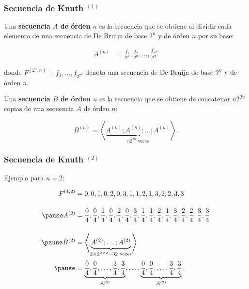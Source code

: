\documentclass[t, 10pt, mathserif]{beamer}
\begin{document}

\begin{frame}
  \frametitle{Secuencia de Knuth {$^{(1)}$}}

  \vspace{-0.4cm}
  \begin{definition}
    Una \textbf{secuencia $A$ de órden $n$} es la secuencia que se obtiene al dividir cada elemento de una secuencia de De Bruijn de base $2^n$ y de órden $n$ por su base:
    \pause

    \vspace{-0.2cm}
    \begin{equation*}
      \begin{aligned}
        A^{(n)} & = \frac{f_1}{2^n}, \frac{f_2}{2^n}, \dots, \frac{f_{2^{n^2}}}{2^n}
      \end{aligned}
    \end{equation*}

    \vspace{-0.2cm}
    donde $F^{(2^n, n)} = f_1, \dots, f_{2^{n^2}}$ denota una secuencia de De Bruijn de base $2^n$ y de órden $n$.
    \pause

    Una \textbf{secuencia $B$ de órden $n$} es la secuencia que se obtiene de concatenar $n 2^{2 n}$ copias de una secuencia $A$ de órden $n$:
    \pause

    \vspace{-0.2cm}
    \begin{equation*}
      B^{(n)} = \left< \underbrace{A^{(n)} ; A^{(n)} ; \dots ; A^{(n)}}_{n 2^{2 n} \text{ veces}} \right> \text{.}
    \end{equation*}
  \end{definition}
\end{frame}



\begin{frame}
  \frametitle{Secuencia de Knuth {$^{(2)}$}}

  Ejemplo para $n = 2$:
  \pause

  \begin{equation*}
    \begin{aligned}
      F^{(4, 2)} & = 0, 0, 1, 0, 2, 0, 3, 1, 1, 2, 1, 3, 2, 2, 3, 3 \\[0.4cm] \pause
      A^{(2)}    & = \frac{0}{4}, \frac{0}{4}, \frac{1}{4}, \frac{0}{4}, \frac{2}{4}, \frac{0}{4}, \frac{3}{4}, \frac{1}{4}, \frac{1}{4}, \frac{2}{4}, \frac{1}{4}, \frac{3}{4}, \frac{2}{4}, \frac{2}{4}, \frac{3}{4}, \frac{3}{4} \\[0.4cm] \pause
      B^{(2)}   & = \left< \underbrace{A^{(2)} ; \dots ; A^{(2)}}_{2 \times 2^{2 \times 2} = 32 \text{ veces}} \right> \\[0.1cm] \pause
                & = \underbrace{\frac{0}{4}, \frac{0}{4}, \dots, \frac{3}{4}, \frac{3}{4}}_{A^{(2)}}, \dots, \underbrace{\frac{0}{4}, \frac{0}{4}, \dots, \frac{3}{4}, \frac{3}{4}}_{A^{(2)}} \text{.}
    \end{aligned}
  \end{equation*}
\end{frame}
\end{document}
